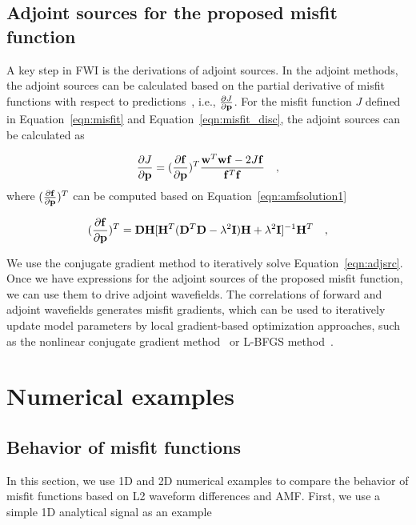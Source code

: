 \subsection{Adjoint sources for the proposed misfit function}
A key step in FWI is the derivations of adjoint sources.
In the adjoint methods,  the adjoint sources can be calculated based on the partial derivative 
of misfit functions with respect to predictions~\citep{Plessix2006}, 
i.e., $\frac{\partial J}{\partial {\bf p}}$. For the misfit function $J$ 
defined in Equation~\ref{eqn:misfit}
and Equation~\ref{eqn:misfit_disc}, the adjoint sources can be calculated as

\begin{equation}
\label{eqn:adjsrc}
\frac{\partial J}{\partial {\bf p}}=(\frac{\partial {\bf f}}{\partial \bf p})^T\frac{{\bf w}^T{\bf w}{\bf f}-2 J {\bf f}}{{\bf f}^T{\bf f}} 
\quad ,
\end{equation}
where $(\frac{\partial {\bf f}}{\partial {\bf p}})^T$ can be computed based on Equation~\ref{eqn:amfsolution1}

\begin{equation}
\label{eqn:deriw}
(\frac{\partial {\bf f}}{\partial {\bf p}})^T={\bf D}{\bf H}[{\bf H}^T({\bf D}^T{\bf D}-\lambda^2{\bf I}){\bf H}+\lambda^2{\bf I}]^{-1}{\bf H}^T 
\quad ,
\end{equation}

We use the conjugate gradient method to iteratively solve Equation~\ref{eqn:adjsrc}.
Once we have expressions for the adjoint sources of the proposed misfit function, we can use them to 
drive adjoint wavefields. The correlations of forward and adjoint wavefields generates misfit gradients, 
which can be used to iteratively update model parameters by local gradient-based optimization approaches,
such as the nonlinear conjugate gradient method~\citep{Fletcher1964} or L-BFGS method~\citep{Nocedal1980}.

\section{Numerical examples}
\subsection{Behavior of misfit functions}
In this section, we use 1D and 2D numerical examples to compare the behavior of misfit functions 
based on L2 waveform differences and AMF. 
First, we use a simple 1D analytical signal as an example 


